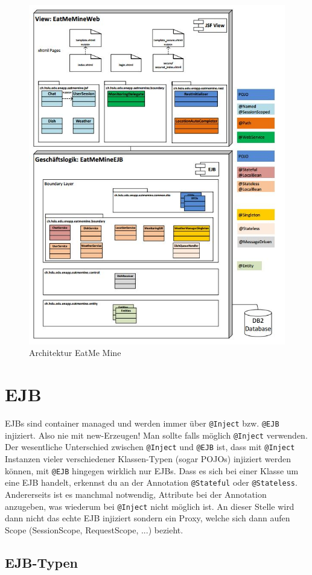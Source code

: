 \begin{figure}[h!]
\centering
\includegraphics[width=0.7\linewidth]{fig/tooling-architektur-eatmemine}
\caption{Architektur EatMe Mine}
\label{fig:tooling-architektur-eatmemine}
\end{figure}

\section{EJB}

EJBs sind container managed und werden immer über \verb|@Inject| bzw. \verb|@EJB| injiziert. Also nie mit new-Erzeugen! Man sollte falls möglich \verb|@Inject| verwenden. Der wesentliche Unterschied zwischen \verb|@Inject| und \verb|@EJB| ist, dass mit \verb|@Inject| Instanzen vieler verschiedener Klassen-Typen (sogar POJOs) injiziert werden können, mit \verb|@EJB| hingegen wirklich nur EJBs. Dass es sich bei einer Klasse um eine EJB handelt, erkennst du an der Annotation \verb|@Stateful| oder \verb|@Stateless|. Andererseits ist es manchmal notwendig, Attribute bei der Annotation anzugeben, was wiederum bei \verb|@Inject| nicht möglich ist. An dieser Stelle wird dann nicht das echte EJB injiziert sondern ein Proxy, welche sich dann aufen Scope (SessionScope, RequestScope, ...) bezieht.

\subsection{EJB-Typen}

